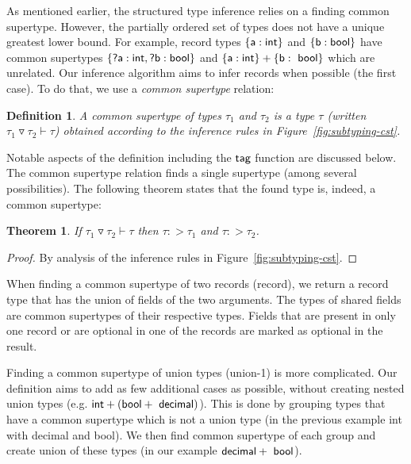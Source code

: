 \documentclass[10pt]{sigplanconf}
\newtheorem{definition}{Definition}
\newtheorem{theorem}{Theorem}
\newcommand{\ident}[1]{\textnormal{\sffamily #1}}
\newcommand{\tytagof}{\ident{tag}}
\begin{document}
As mentioned earlier, the structured type inference relies on a finding common supertype. However,
the partially ordered set of types does not have a unique greatest lower bound. For example, record types
$\{\ident{a}:\ident{int}\}$ and $\{\ident{b}:\ident{bool}\}$ have common supertypes
$\{\ident{?a}:\ident{int}, \ident{?b}:\ident{bool}\}$ and $\{\ident{a}:\ident{int}\} + \{\ident{b}:\ident{bool}\}$
which are unrelated.
Our inference algorithm aims to infer records when possible (the first case). To do that, we use
a \emph{common supertype} relation: 

\begin{definition}
A \emph{common supertype} of types $\tau_1$ and $\tau_2$ is a type $\tau$ (written $\tau_1 \triangledown \tau_2 \vdash \tau$)
obtained according to the inference rules in Figure~\ref{fig:subtyping-cst}.
\end{definition}

Notable aspects of the definition including the $\tytagof$ function are discussed below.
The common supertype relation finds a single supertype (among several possibilities). 
The following theorem states that the found type is, indeed, a common supertype:

\begin{theorem}
If $\tau_1 \triangledown \tau_2 \vdash \tau$ then $\tau :> \tau_1$ and $\tau :> \tau_2$.
\end{theorem}
\begin{proof}
By analysis of the inference rules in Figure~\ref{fig:subtyping-cst}.
\end{proof}

\noindent
When finding a common supertype of two records (record), we return a record type that has the union
of fields of the two arguments. The types of shared fields are common supertypes of their respective
types. Fields that are present in only one record or are optional in one of the records are marked
as optional in the result.

Finding a common supertype of union types (union-1) is more complicated. Our definition aims to add
as few additional cases as possible, without creating nested union types (e.g. $\ident{int} + (\ident{bool} + \ident{decimal})$).
This is done by grouping types that have a common supertype which is not a union type (in the previous
example \ident{int} with \ident{decimal} and \ident{bool}). We then find common supertype of each group and create union
of these types (in our example $\ident{decimal} + \ident{bool}$).
\end{document}
